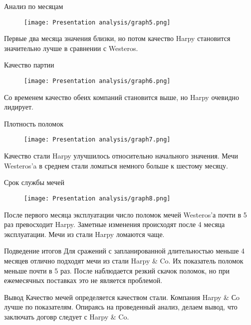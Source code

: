 \documentclass{beamer}
\begin{document}
    \begin{frame}{Анализ по месяцам}
        \begin{figure}
            \centering
            \texttt{[image: Presentation analysis/graph5.png]}
        \end{figure}
       Первые два месяца значения близки, но потом качество Harpy становится значительно лучше в сравнении с Westeros.
    \end{frame}
    
    \begin{frame}{Качество партии}
        \begin{figure}
            \centering
            \texttt{[image: Presentation analysis/graph6.png]}
        \end{figure}
        Со временем качество обеих компаний становится выше, но Harpy очевидно лидирует.
    \end{frame}
    
    \begin{frame}{Плотность поломок}
        \begin{figure}
            \centering
            \texttt{[image: Presentation analysis/graph7.png]}
        \end{figure}
        Качество стали Harpy улучшилось относительно начального значения. 
        Мечи Westeros'a в среднем стали ломаться немного больше к шестому месяцу.
    \end{frame}
    
    \begin{frame}{Срок службы мечей}
        \begin{figure}
            \centering
            \texttt{[image: Presentation analysis/graph8.png]}
        \end{figure}
        После первого месяца эксплуатации число поломок мечей Westeros'а почти в 5 раз превосходит Harpy.
        Заметные изменения происходят после 4 месяца эксплуатации. Мечи из стали Harpy ломаются чаще.
    \end{frame}
    \begin{frame}{Подведение итогов}
        Для сражений с запланированной длительностью меньше 4 месяцев отлично подходят мечи из стали Harpy \& Co. Их показатель поломок меньше почти в 5 раз. После наблюдается резкий скачок поломок, но при ежемесячных поставках это не является проблемой. 
        
    \end{frame}
\begin{frame}{Вывод}
      Качество мечей определяется качеством стали. Компания Harpy \& Сo лучше по показателям.
      Опираясь на проведенный анализ, делаем вывод, что заключать договр следует с Harpy \& Co.
        
    \end{frame}
\end{document}
